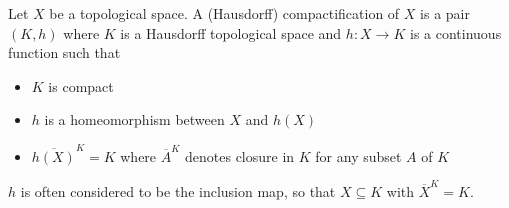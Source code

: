 \documentclass[12pt]{article}
\begin{document}
Let $X$ be a topological space.  A (Hausdorff) compactification of $X$ is a pair $(K,h)$ where $K$ is a Hausdorff topological space and $h:X\rightarrow K$ is a continuous function such that
\begin{itemize}
\item  $K$ is compact
\item  $h$ is a homeomorphism between $X$ and $h(X)$
\item  $\overline{h(X)}^K=K$ where $\overline{A}^K$ denotes closure in $K$ for any subset $A$ of $K$
\end{itemize}

$h$ is often considered to be the inclusion map, so that $X\subseteq K$ with $\overline{X}^K=K$.
\end{document}

